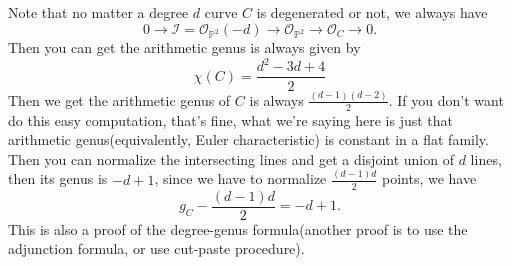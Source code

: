\documentclass[../main.tex]{subfiles}
\begin{document}
\begin{example}
Note that no matter a degree $d$ curve $C$ is degenerated or not, we always have 
$$0\rightarrow \mathscr{I}=\mathcal{O}_{\mathbb{P}^{2}}(-d)\rightarrow \mathcal{O}_{\mathbb{P}^{2}}\rightarrow \mathcal{O}_{C}\rightarrow 0.$$
Then you can get the arithmetic genus is always given by 
$$\chi(C)= \frac{d^{2}-3d+4}{2}$$
Then we get the arithmetic genus of $C$ is always $\frac{(d-1)(d-2)}{2}$. If you don't want do this easy computation, that's fine, what we're saying here is just that arithmetic genus(equivalently, Euler characteristic) is constant in a flat family. Then you can normalize the intersecting lines and get a disjoint union of $d$ lines, then its genus is $-d+1$, since we have to normalize $\frac{(d-1)d}{2}$ points, we have 
$$g_{C}-\frac{(d-1)d}{2}=-d+1.$$
This is also a proof of the degree-genus formula(another proof is to use the adjunction formula, or use cut-paste procedure). 
\end{example}
\end{document}
